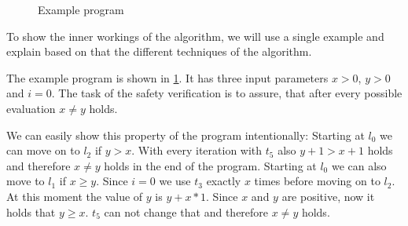 \begin{figure}
\centering
{}
\caption{Example program}
\label{fig:example}
\end{figure}

To show the inner workings of the algorithm, we will use a single example and explain based on that the different techniques of the algorithm.

The example program is shown in \ref{fig:example}.
It has three input parameters $x>0$, $y>0$ and $i=0$.
The task of the safety verification is to assure, that after every possible evaluation $x \neq y$ holds.

We can easily show this property of the program intentionally:
Starting at $l_0$ we can move on to $l_2$ if $y>x$.
With every iteration with $t_5$ also $y+1>x+1$ holds and therefore $x \neq y$ holds in the end of the program.
Starting at $l_0$ we can also move to $l_1$ if $x \geq y$.
Since $i=0$ we use $t_3$ exactly $x$ times before moving on to $l_2$.
At this moment the value of $y$ is $y + x * 1$.
Since $x$ and $y$ are positive, now it holds that $y \geq x$.
$t_5$ can not change that and therefore $x \neq y$ holds.
